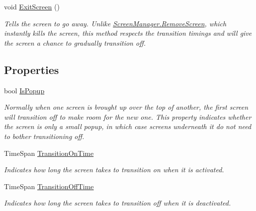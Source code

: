\begin{DoxyCompactItemize}
void \hyperlink{classCityMania_1_1GameScreen_ada4a6b75da175b4286662d888eefc3e2}{ExitScreen} ()
\begin{DoxyCompactList}\small\item\em Tells the screen to go away. Unlike \hyperlink{classCityMania_1_1ScreenManager_ae9d2ac095225f11261734ca461847242}{ScreenManager.RemoveScreen}, which instantly kills the screen, this method respects the transition timings and will give the screen a chance to gradually transition off. \item\end{DoxyCompactList}\end{DoxyCompactItemize}
\subsection*{Properties}
\begin{DoxyCompactItemize}
\item 
bool \hyperlink{classCityMania_1_1GameScreen_ac1650f02642474499b1d750454a07811}{IsPopup}
\begin{DoxyCompactList}\small\item\em Normally when one screen is brought up over the top of another, the first screen will transition off to make room for the new one. This property indicates whether the screen is only a small popup, in which case screens underneath it do not need to bother transitioning off. \item\end{DoxyCompactList}\item 
TimeSpan \hyperlink{classCityMania_1_1GameScreen_af9bb1ff62e3922e0553977cd8ea5aeb3}{TransitionOnTime}
\begin{DoxyCompactList}\small\item\em Indicates how long the screen takes to transition on when it is activated. \item\end{DoxyCompactList}\item 
TimeSpan \hyperlink{classCityMania_1_1GameScreen_a3f775f10cd0d16be17c9cdbdf9f058b8}{TransitionOffTime}
\begin{DoxyCompactList}\small\item\em Indicates how long the screen takes to transition off when it is deactivated. \item\end{DoxyCompactList}\item 

\end{DoxyCompactItemize}
